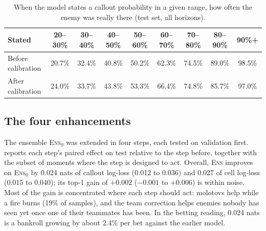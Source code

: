\documentclass[11pt]{article}
\newcommand{\model}[1]{\textsc{#1}}
\newcommand{\1}{\mathbb{1}}
\begin{document}
\begin{table}[t]
\centering
\caption{When the model states a callout probability in a given range, how often the enemy was really there (test set, all horizons).}
\label{tab:reliability}
\small
\setlength{\tabcolsep}{4.5pt}
\begin{tabular}{@{}lcccccccc@{}}
\toprule
Stated & 20--30\% & 30--40\% & 40--50\% & 50--60\% & 60--70\% & 70--80\% & 80--90\% & 90\%+ \\
\midrule
Before calibration & 20.7\% & 32.4\% & 40.8\% & 50.2\% & 62.3\% & 74.5\% & 89.0\% & 98.5\% \\
After calibration & 24.0\% & 33.7\% & 43.8\% & 53.3\% & 66.4\% & 74.8\% & 85.7\% & 97.0\% \\
\bottomrule
\end{tabular}
\end{table}

\subsection{The four enhancements}
\label{sec:enhancements}
The ensemble \model{Ens$_0$} was extended in four steps, each tested on validation first.  reports each step's paired effect on test relative to the step before, together with the subset of moments where the step is designed to act. Overall, \model{Ens} improves on \model{Ens$_0$} by 0.024 nats of callout log-loss (0.012 to 0.036) and 0.027 of cell log-loss (0.015 to 0.040); its top-1 gain of $+0.002$ ($-0.001$ to $+0.006$) is within noise. Most of the gain is concentrated where each step should act: molotovs help while a fire burns (19\% of samples), and the team correction helps enemies nobody has seen yet once one of their teammates has been. In the betting reading, 0.024 nats is a bankroll growing by about 2.4\% per bet against the earlier model.
\end{document}
